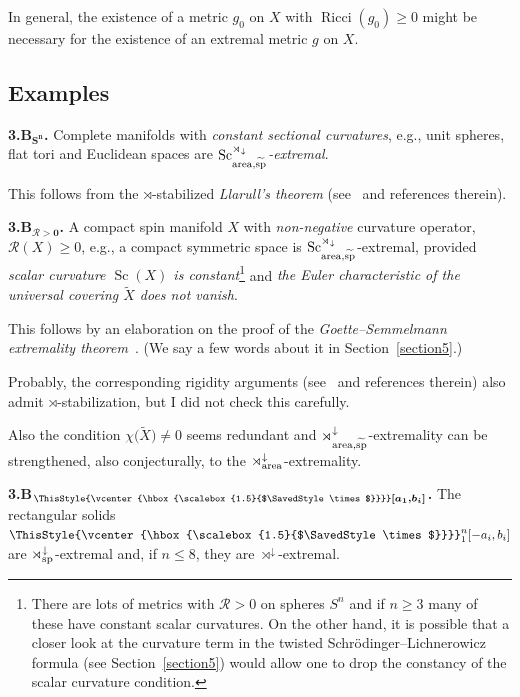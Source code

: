 \documentclass[10pt,a4paper]{amsart}
\numberwithin{equation}{section}
\newcommand\bigtimes{\mathbin{\ThisStyle{\vcenter{\hbox{%
\scalebox{1.5}{$\SavedStyle\times$}}}}}}
\begin{document}
In general, the existence of a metric $g_0$ on $X$ with $\operatorname{Ricci}(g_0)\geq 0$ might be necessary for the existence of an extremal metric $g$ on $X$.

\subsection*{Examples}

\textbf{3.B$\boldsymbol{{}_{S^n}}$.}
 Complete manifolds with {\it constant sectional curvatures}, e.g., unit spheres, flat tori and Euclidean spaces
 are {\it $\operatorname{Sc}^{\rtimes_\downarrow}_{{\rm area},\widetilde{\rm sp}}$-extremal}.

 This follows from the $\rtimes$-stabilized {\it Llarull's theorem} (see~\cite{Gr2021} and references therein).

\textbf{3.B$\boldsymbol{{}_{\mathcal R>0}}$.} A compact spin manifold $X$
 with {\it non-negative} curvature operator, $ \mathcal R(X)\geq 0$,
e.g., a compact symmetric space is $\operatorname{Sc}^{\rtimes_\downarrow}_{{\rm area},\widetilde{\rm sp}}$-extremal, provided {\it scalar curvature $\operatorname{Sc}(X)$ is constant}\footnote{There are lots of metrics with $\mathcal R>0$ on spheres $S^n$ and if $n\geq 3$ many of these have constant scalar curvatures.
On the other
 hand, it is possible that a closer look at the curvature term in the twisted Schr\"odinger--Lichnerowicz formula (see Section~\ref{section5}) would allow one to drop the constancy of the scalar curvature condition.}
 and {\it the Euler characteristic of the universal covering $\tilde X$ does not vanish}.

 This follows
 by an elaboration on the proof of the {\it Goette--Semmelmann extremality theorem}~\cite{GS2002}. (We say a few words about it in Section~\ref{section5}.)

Probably, the corresponding rigidity arguments (see~\cite{Li2010} and references therein) also
 admit $\rtimes $-stabilization, but I did not check this carefully.

Also the
 condition $\chi\bigl(\tilde X\bigr)\neq 0$ seems redundant and $\rtimes^{\downarrow}_{{\rm area},\widetilde{\rm sp}}$-extremality can be strengthened, also conjecturally, to
 the $\rtimes^{\downarrow}_{\rm area}$-extremality.

\textbf{3.B$\boldsymbol{{}_{\bigtimes [a_1,b_i]}}$.} The rectangular solids $\bigtimes_1^n[-a_i,b_i]$
 are $\rtimes^\downarrow_{\rm sp}$-extremal and, if $n\leq 8$, they are ${\rtimes^\downarrow}$-extremal.
\end{document}
